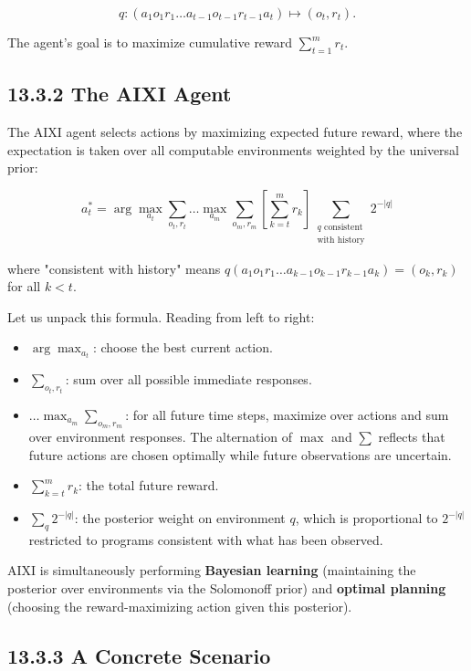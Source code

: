 \[
q: (a_1 o_1 r_1 \ldots a_{t-1} o_{t-1} r_{t-1} a_t) \mapsto (o_t, r_t).
\]

The agent's goal is to maximize cumulative reward $\sum_{t=1}^m r_t$.

\subsection{13.3.2 The AIXI Agent}

\begin{definition}
The AIXI agent selects actions by maximizing expected future reward, where the expectation is taken over all computable environments weighted by the universal prior:

\[
a_t^* = \arg\max_{a_t} \sum_{o_t, r_t} \ldots \max_{a_m} \sum_{o_m, r_m} \left[\sum_{k=t}^{m} r_k \right] \sum_{\substack{q \text{ consistent} \\ \text{with history}}} 2^{-|q|}
\]

where "consistent with history" means $q(a_1 o_1 r_1 \ldots a_{k-1} o_{k-1} r_{k-1} a_k) = (o_k, r_k)$ for all $k < t$.

Let us unpack this formula. Reading from left to right:
\end{definition}

\begin{itemize}
  \item $\arg\max_{a_t}$: choose the best current action.
  \item $\sum_{o_t, r_t}$: sum over all possible immediate responses.
  \item $\ldots \max_{a_m} \sum_{o_m, r_m}$: for all future time steps, maximize over actions and sum over environment responses. The alternation of $\max$ and $\sum$ reflects that future actions are chosen optimally while future observations are uncertain.
  \item $\sum_{k=t}^{m} r_k$: the total future reward.
  \item $\sum_{q} 2^{-|q|}$: the posterior weight on environment $q$, which is proportional to $2^{-|q|}$ restricted to programs consistent with what has been observed.
\end{itemize}

AIXI is simultaneously performing \textbf{Bayesian learning} (maintaining the posterior over environments via the Solomonoff prior) and \textbf{optimal planning} (choosing the reward-maximizing action given this posterior).

\subsection{13.3.3 A Concrete Scenario}


